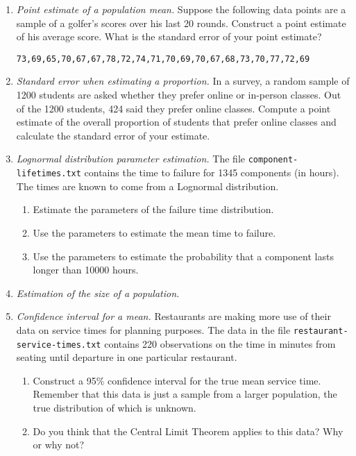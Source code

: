 \begin{enumerate}
\item \emph{Point estimate of a population mean.} Suppose the
  following data points are a sample of a golfer's scores over his
  last 20 rounds. Construct a point estimate of his average
  score. What is the standard error of your point estimate?
\begin{verbatim}
73,69,65,70,67,67,78,72,74,71,70,69,70,67,68,73,70,77,72,69
\end{verbatim}
  
\item \emph{Standard error when estimating a proportion.} In a survey, a
  random sample of \num{1200} students are asked whether they prefer
  online or in-person classes.  Out of the \num{1200} students,
  \num{424} said they prefer online classes. Compute a point estimate
  of the overall proportion of students that prefer online classes and
  calculate the standard error of your estimate.

\item \emph{Lognormal distribution parameter estimation.}  The file
  \texttt{component-lifetimes.txt} contains the time to failure for
  \num{1345} components (in hours). The times are known to come from a
  Lognormal distribution. 
\begin{enumerate}
\item Estimate the parameters of the failure time distribution. 
\item Use the parameters to estimate the mean time to failure. 
\item Use the parameters to estimate the probability that a component lasts
  longer than \num{10000} hours.
\end{enumerate}

\item \emph{Estimation of the size of a population.}


\item \emph{Confidence interval for a mean.} Restaurants are making
  more use of their data on service times for planning purposes.  The
  data in the file \texttt{restaurant-service-times.txt} contains 220
  observations on the time in minutes from seating until departure in
  one particular restaurant. 
\begin{enumerate}
\item Construct a 95\% confidence interval for the true mean service
  time. Remember that this data is just a sample from a larger
  population, the true distribution of which is unknown.
\item Do you think that the Central Limit Theorem applies to this
  data? Why or why not?
\end{enumerate}


\end{enumerate}
